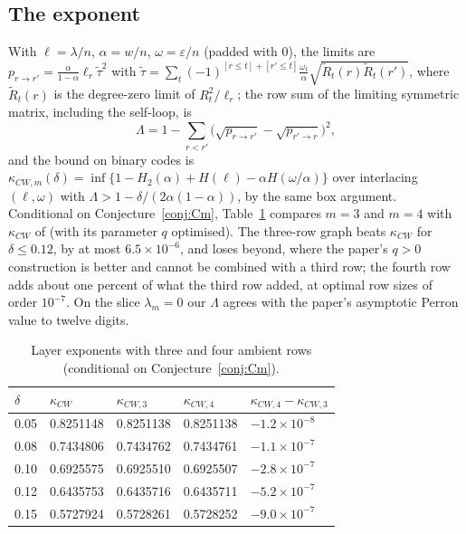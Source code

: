\documentclass[11pt]{amsart}
\theoremstyle{definition}
\newcommand{\Htwo}{H_2}
\begin{document}
\subsection{The exponent}
With $\ell=\lambda/n$, $\alpha=w/n$, $\omega=\varepsilon/n$ (padded with $0$), the limits are $p_{r\to r'}=\frac\alpha{1-\alpha}\ell_r\tilde\tau^2$ with $\tilde\tau=\sum_t(-1)^{[r\le t]+[r'\le t]}\frac{\omega_t}\alpha\sqrt{\tilde R_t(r)\tilde R_t(r')}$, where $\tilde R_t(r)$ is the degree-zero limit of $R_t^2/\ell_r$; the row sum of the limiting symmetric matrix, including the self-loop, is
\[
\Lambda=1-\sum_{r<r'}\big(\sqrt{p_{r\to r'}}-\sqrt{p_{r'\to r}}\big)^2,
\]
and the bound on binary codes is $\kappa_{CW,m}(\delta)=\inf\{1-\Htwo(\alpha)+H(\ell)-\alpha H(\omega/\alpha)\}$ over interlacing $(\ell,\omega)$ with $\Lambda>1-\delta/(2\alpha(1-\alpha))$, by the same box argument. Conditional on Conjecture~\ref{conj:Cm}, Table~\ref{tab:layers} compares $m=3$ and $m=4$ with $\kappa_{CW}$ of \cite{OAI2026} (with its parameter $q$ optimised). The three-row graph beats $\kappa_{CW}$ for $\delta\le0.12$, by at most $6.5\times10^{-6}$, and loses beyond, where the paper's $q>0$ construction is better and cannot be combined with a third row; the fourth row adds about one percent of what the third row added, at optimal row sizes of order $10^{-7}$. On the slice $\lambda_m=0$ our $\Lambda$ agrees with the paper's asymptotic Perron value to twelve digits.

\begin{table}[ht]
\centering
\begin{tabular}{@{}lllll@{}}\toprule
$\delta$ & $\kappa_{CW}$ \cite{OAI2026} & $\kappa_{CW,3}$ & $\kappa_{CW,4}$ & $\kappa_{CW,4}-\kappa_{CW,3}$\\\midrule
0.05 & 0.8251148 & 0.8251138 & 0.8251138 & $-1.2\times10^{-8}$\\
0.08 & 0.7434806 & 0.7434762 & 0.7434761 & $-1.1\times10^{-7}$\\
0.10 & 0.6925575 & 0.6925510 & 0.6925507 & $-2.8\times10^{-7}$\\
0.12 & 0.6435753 & 0.6435716 & 0.6435711 & $-5.2\times10^{-7}$\\
0.15 & 0.5727924 & 0.5728261 & 0.5728252 & $-9.0\times10^{-7}$\\
\bottomrule
\end{tabular}
\caption{Layer exponents with three and four ambient rows (conditional on Conjecture~\ref{conj:Cm}).}\label{tab:layers}
\end{table}
\end{document}

